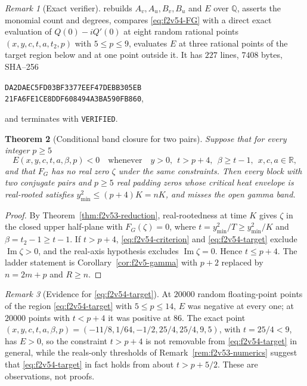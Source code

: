 \documentclass[11pt]{article}
\newtheorem{theorem}{Theorem}[section]
\theoremstyle{definition}
\theoremstyle{remark}
\newtheorem{remark}[theorem]{Remark}
\begin{document}
\begin{remark}[Exact verifier]
\label{rem:f2v54-verifier-E}
 rebuilds
\(A_v,A_u,B_v,B_u\) and \(E\) over \(\mathbb Q\), asserts the monomial
count and degrees, compares \eqref{eq:f2v54-FG} with a direct exact
evaluation of \(Q(0)-iQ'(0)\) at eight random rational points
\((x,y,c,t,a,t_2,p)\) with \(5\le p\le9\), evaluates \(E\) at three
rational points of the target region below and at one point outside it.
It has \(227\) lines, \(7408\) bytes, SHA--256
\begin{center}
\texttt{DA2DAEC5FD03BF3377EEF47DEBB305EB}\\
\texttt{21FA6FE1CE8DDF608494A3BA590FB860},
\end{center}
and terminates with \texttt{VERIFIED}.
\end{remark}

\begin{theorem}[Conditional band closure for two pairs]
\label{thm:f2v54-conditional}
Suppose that for every integer \(p\ge5\)
\begin{equation}
 E(x,y,c,t,a,\beta,p)<0\quad\text{whenever}\quad
 y>0,\ \ t>p+4,\ \ \beta\ge t-1,\ \ x,c,a\in\mathbb R,
 \label{eq:f2v54-target}
\end{equation}
and that \(F_G\) has no real zero \(\zeta\) under the same constraints.
Then every block with two conjugate pairs and \(p\ge5\) real padding
zeros whose critical heat envelope is real-rooted satisfies
\(y_{\min}^2\le(p+4)K=nK\), and misses the open gamma band.
\end{theorem}

\begin{proof}
By Theorem~\ref{thm:f2v53-reduction}, real-rootedness at time \(K\)
gives \(\zeta\) in the closed upper half-plane with \(F_G(\zeta)=0\),
where \(t=y_{\min}^2/T\ge y_{\min}^2/K\) and \(\beta=t_2-1\ge t-1\).  If
\(t>p+4\), \eqref{eq:f2v54-criterion} and \eqref{eq:f2v54-target}
exclude \(\operatorname{Im}\zeta>0\), and the real-axis hypothesis
excludes \(\operatorname{Im}\zeta=0\).  Hence \(t\le p+4\).  The ladder
statement is Corollary~\ref{cor:f2v5-gamma} with \(p+2\) replaced by
\(n=2m+p\) and \(R\ge n\).
\end{proof}

\begin{remark}[Evidence for \eqref{eq:f2v54-target}]
\label{rem:f2v54-evidence}
At \(20000\) random floating-point points of the region
\eqref{eq:f2v54-target} with \(5\le p\le14\), \(E\) was negative at
every one; at \(20000\) points with \(t<p+4\) it was positive at
\(86\).  The exact point
\((x,y,c,t,a,\beta,p)=(-11/8,1/64,-1/2,25/4,25/4,9,5)\), with
\(t=25/4<9\), has \(E>0\), so the constraint \(t>p+4\) is not
removable from \eqref{eq:f2v54-target} in general, while the reals-only
thresholds of Remark~\ref{rem:f2v53-numerics} suggest that
\eqref{eq:f2v54-target} in fact holds from about \(t>p+5/2\).  These are
observations, not proofs.
\end{remark}
\end{document}

